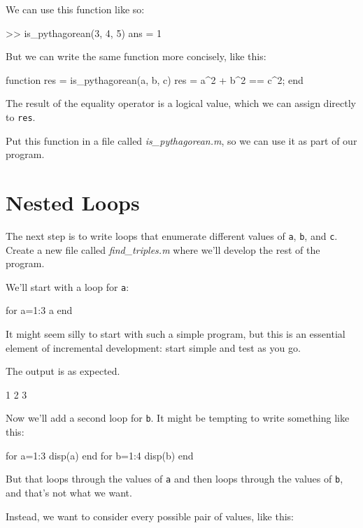 We can use this function like so:


\begin{code}
>> is_pythagorean(3, 4, 5)
ans = 1
\end{code}

But we can write the same function more concisely, like this:

\begin{code}
function res = is_pythagorean(a, b, c)
    res = a^2 + b^2 == c^2;
end
\end{code}

The result of the equality operator is a logical value, which we can assign directly
to \lstinline{res}.

Put this function in a file called \emph{is\_pythagorean.m}, so we can use it as part of our program.


\section{Nested Loops}

The next step is to write loops that enumerate different values of \lstinline{a}, \lstinline{b}, and
\lstinline{c}.  Create a new file called \emph{find\_triples.m} where we'll develop the rest of the program.


We'll start with a loop for \lstinline{a}:

\begin{code}
for a=1:3
    a
end
\end{code}

It might seem silly to start with such a simple program, but this is an essential element of incremental development: start simple and test as you go.

The output is as expected.

\begin{code}
1
2
3
\end{code}

Now we'll add a second loop for \lstinline{b}.  It might be tempting to write something like this:

\begin{code}
for a=1:3
    disp(a)
end
for b=1:4
    disp(b)
end
\end{code}

But that loops through the values of \lstinline{a} and then loops through the values of \lstinline{b}, and that's not what we want.

Instead, we want to consider every possible pair of values, like this:

